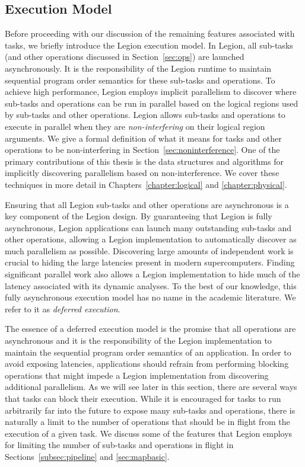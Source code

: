\subsection{Execution Model}
\label{subsec:execmodel}
Before proceeding with our discussion of
the remaining features associated with tasks,
we briefly introduce the Legion execution
model. In Legion, all sub-tasks (and other
operations discussed in Section~\ref{sec:ops})
are launched asynchronously. It is the 
responsibility of the Legion runtime to 
maintain sequential program order semantics
for these sub-tasks and operations. To achieve
high performance, Legion employs implicit
parallelism to discover where sub-tasks and
operations can be run in parallel based on
the logical regions used by sub-tasks and
other operations. Legion allows sub-tasks
and operations to execute in parallel
when they are {\em non-interfering} on 
their logical region arguments. We give
a formal definition of what it means for tasks
and other operations to be non-interfering in 
Section~\ref{sec:noninterference}. One of the 
primary contributions of this thesis is the 
data structures and algorithms for implicitly 
discovering  parallelism based on non-interference.
We cover these techniques in more detail
in Chapters~\ref{chapter:logical} and
\ref{chapter:physical}.

Ensuring that all Legion sub-tasks and other
operations are asynchronous is a key component
of the Legion design. By guaranteeing that Legion
is fully asynchronous, Legion applications can
launch many outstanding sub-tasks and other
operations, allowing a Legion implementation to
automatically discover as much parallelism as
possible. Discovering large amounts of independent
work is crucial to hiding the large latencies
present in modern supercomputers. Finding significant
parallel work also allows a Legion implementation
to hide much of the latency associated with its 
dynamic analyses. To the best of our knowledge,
this fully asynchronous execution model has
no name in the academic literature. We refer
to it as {\em deferred execution}.

The essence of a deferred execution model is
the promise that all operations are asynchronous
and it is the responsibility of the Legion
implementation to maintain the sequential program
order semantics of an application. In order to
avoid exposing latencies, applications should
refrain from performing blocking operations that
might impede a Legion implementation from discovering
additional parallelism. As we will see later in this
section, there are several ways that tasks can block 
their execution. While it is encouraged for tasks to 
run arbitrarily far into the future to expose many 
sub-tasks and operations, there is naturally a limit 
to the number of operations that should be in flight 
from the execution of a given task.  We discuss some 
of the features that Legion employs for limiting the 
number of sub-tasks and operations in flight in 
Sections~\ref{subsec:pipeline}
and \ref{sec:mapbasic}.

